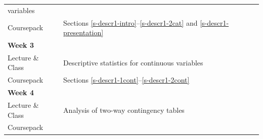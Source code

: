 \documentclass[11pt,a4paper,openany]{book}
\begin{document}
\begin{longtable}[]{@{}ll@{}}
\begin{minipage}[t]{0.76\columnwidth}
variables\strut
\end{minipage}\tabularnewline
\begin{minipage}[t]{0.19\columnwidth}\raggedright\strut
Coursepack\strut
\end{minipage} & \begin{minipage}[t]{0.76\columnwidth}\raggedright\strut
Sections \ref{s-descr1-intro}--\ref{s-descr1-2cat} and
\ref{s-descr1-presentation}\strut
\end{minipage}\tabularnewline
\begin{minipage}[t]{0.19\columnwidth}\raggedright\strut
\textbf{Week 3}\strut
\end{minipage} & \begin{minipage}[t]{0.76\columnwidth}\raggedright\strut
\strut
\end{minipage}\tabularnewline
\begin{minipage}[t]{0.19\columnwidth}\raggedright\strut
Lecture \& Class\strut
\end{minipage} & \begin{minipage}[t]{0.76\columnwidth}\raggedright\strut
Descriptive statistics for continuous variables\strut
\end{minipage}\tabularnewline
\begin{minipage}[t]{0.19\columnwidth}\raggedright\strut
Coursepack\strut
\end{minipage} & \begin{minipage}[t]{0.76\columnwidth}\raggedright\strut
Sections \ref{s-descr1-1cont}--\ref{s-descr1-2cont}\strut
\end{minipage}\tabularnewline
\begin{minipage}[t]{0.19\columnwidth}\raggedright\strut
\textbf{Week 4}\strut
\end{minipage} & \begin{minipage}[t]{0.76\columnwidth}\raggedright\strut
\strut
\end{minipage}\tabularnewline
\begin{minipage}[t]{0.19\columnwidth}\raggedright\strut
Lecture \& Class\strut
\end{minipage} & \begin{minipage}[t]{0.76\columnwidth}\raggedright\strut
Analysis of two-way contingency tables\strut
\end{minipage}\tabularnewline
\begin{minipage}[t]{0.19\columnwidth}\raggedright\strut
Coursepack\strut
\end{minipage} & \begin{minipage}[t]{0.76\columnwidth}\raggedright\strut

\end{minipage}
\end{longtable}
\end{document}
